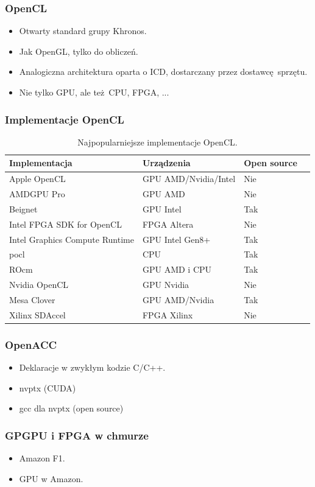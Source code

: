 \documentclass[dvipsnames,table]{beamer}
\begin{document}
\begin{frame}
	\frametitle{OpenCL}
\begin{itemize}
	\item Otwarty standard grupy Khronos.
	\item Jak OpenGL, tylko do obliczeń.
	\item Analogiczna architektura oparta o ICD, dostarczany przez dostawcę sprzętu.
	\item Nie tylko GPU, ale też CPU, FPGA, ...
\end{itemize}
\end{frame}


\begin{frame}[fragile]
	\frametitle{Implementacje OpenCL}
\begin{table}[]
\centering
\caption{Najpopularniejsze implementacje OpenCL.}
\label{porownanie}
\scriptsize
\begin{tabular}{llll}
\hline
Implementacja &  Urządzenia  & Open source   \\ \hline
Apple OpenCL & GPU AMD/Nvidia/Intel & Nie \\
AMDGPU Pro & GPU AMD & Nie \\
Beignet & GPU Intel & Tak \\
Intel FPGA SDK for OpenCL & FPGA Altera & Nie \\
Intel Graphics Compute Runtime & GPU Intel Gen8+ & Tak \\
pocl & CPU & Tak \\
ROcm & GPU AMD i CPU & Tak \\
Nvidia OpenCL & GPU Nvidia & Nie \\
Mesa Clover & GPU AMD/Nvidia & Tak \\
Xilinx SDAccel & FPGA Xilinx & Nie \\ \hline
\end{tabular}
\normalsize
\end{table}
\end{frame}

\begin{frame}
	\frametitle{OpenACC}
\begin{itemize}
	\item Deklaracje w zwykłym kodzie C/C++.
	\item nvptx (CUDA)
	\item gcc dla nvptx (open source)
\end{itemize}
\end{frame}

\begin{frame}
	\frametitle{GPGPU i FPGA w chmurze}
\begin{itemize}
	\item Amazon F1.
	\item GPU w Amazon.
\end{itemize}
\end{frame}
\end{document}
